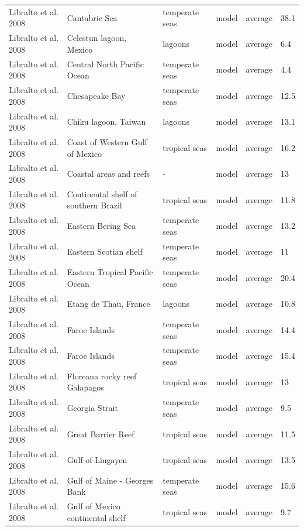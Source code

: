 \documentclass[oneside,12pt,final]{sty/ucthesis-CA2012}
\begin{document}
\begin{mainmatter}
\begin{longtable} {p{3cm}p{3cm}p{1.8cm}lp{2cm}p{1.7cm}}
    Libralto et al. 2008   & Cantabric Sea & temperate seas & model & average & 38.1 \\
    Libralto et al. 2008  & Celestun lagoon, Mexico & lagoons & model & average & 6.4 \\
    Libralto et al. 2008   & Central North Pacific Ocean & temperate seas & model & average & 4.4 \\
    Libralto et al. 2008   & Chesapeake Bay & temperate seas & model & average & 12.5 \\
    Libralto et al. 2008  & Chiku lagoon, Taiwan & lagoons & model & average & 13.1 \\
    Libralto et al. 2008  & Coast of Western Gulf of Mexico & tropical seas & model & average & 16.2 \\
    Libralto et al. 2008  & Coastal areas and reefs & -    & model & average & 13 \\
    Libralto et al. 2008  & Continental shelf of southern Brazil & tropical seas & model & average & 11.8 \\
    Libralto et al. 2008   & Eastern Bering Sea & temperate seas & model & average & 13.2 \\
    Libralto et al. 2008   & Eastern Scotian shelf & temperate seas & model & average & 11 \\
    Libralto et al. 2008   & Eastern Tropical Pacific Ocean & temperate seas & model & average & 20.4 \\
    Libralto et al. 2008  & Etang de Thau, France  & lagoons & model & average & 10.8 \\
    Libralto et al. 2008   & Faroe Islands & temperate seas & model & average & 14.4 \\
    Libralto et al. 2008  & Faroe Islands & temperate seas & model & average & 15.4 \\
    Libralto et al. 2008  & Floreana rocky reef Galapagos & tropical seas & model & average & 13 \\
    Libralto et al. 2008  &  Georgia Strait & temperate seas & model & average & 9.5 \\
    Libralto et al. 2008   & Great Barrier Reef & tropical seas & model & average & 11.5 \\
    Libralto et al. 2008  & Gulf of Lingayen & tropical seas & model & average & 13.5 \\
    Libralto et al. 2008   & Gulf of Maine - Georges Bank & temperate seas & model & average & 15.6 \\
    Libralto et al. 2008   & Gulf of Mexico continental shelf  & tropical seas & model & average & 9.7 \\

\end{longtable}
\end{mainmatter}
\end{document}
